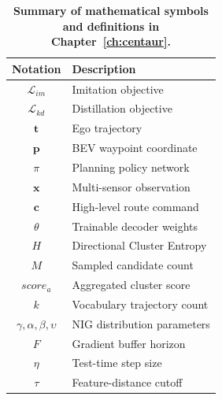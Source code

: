 \begin{table}[t]
  \centering
  \caption[Summary of mathematical symbols and definitions in Chapter~\ref{ch:centaur}]{\textbf{Summary of mathematical symbols and definitions in Chapter~\ref{ch:centaur}.}}
  \label{centaur:tab:notation}
  \begin{tabular}{cl}
    \toprule
    \textbf{Notation} & \textbf{Description} \\
    \midrule
    $\mathcal{L}_{im}$ & Imitation objective \\
    $\mathcal{L}_{kd}$ & Distillation objective \\
    $\mathbf{t}$ & Ego trajectory \\
    $\mathbf{p}$ & BEV waypoint coordinate \\
    $\pi$ & Planning policy network \\
    $\mathbf{x}$ & Multi-sensor observation \\
    $\mathbf{c}$ & High-level route command \\
    $\theta$ & Trainable decoder weights \\
    $H$ & Directional Cluster Entropy \\
    $M$ & Sampled candidate count \\
    $\mathit{score}_a$ & Aggregated cluster score \\
    $k$ & Vocabulary trajectory count \\
    $\gamma, \alpha, \beta, \upsilon$ & NIG distribution parameters \\
    $F$ & Gradient buffer horizon \\
    $\eta$ & Test-time step size \\
    $\tau$ & Feature-distance cutoff \\
    \bottomrule
  \end{tabular}
\end{table}

